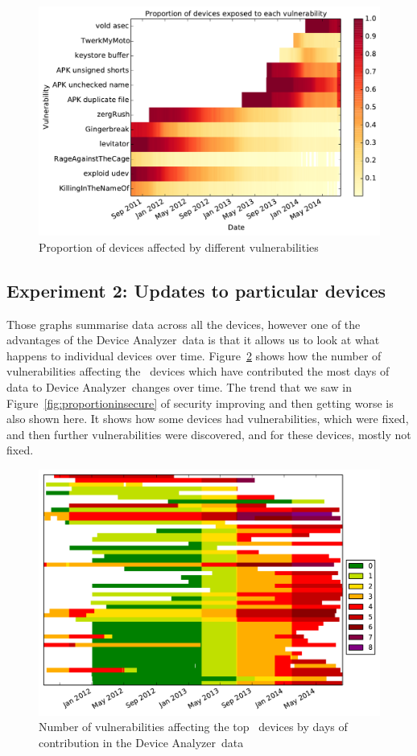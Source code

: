 \documentclass[conference,a4paper,twoside]{IEEEtran}
\newcommand{\da}{Device Analyzer}
\begin{document}
\begin{figure}
 \includegraphics[width=\columnwidth]{figures/nvulnerabilities_heat.pdf}
 \caption{Proportion of devices affected by different vulnerabilities}
 \label{fig:nvulnerabilities_heat}
\end{figure}

\subsection{Experiment 2: Updates to particular devices}\label{sec:exp:device_updates}
Those graphs summarise data across all the devices, however one of the advantages of the \da\ data is that it allows us to look at what happens to individual devices over time.
Figure~\ref{fig:device_data} shows how the number of vulnerabilities affecting the \daNumDeviceDataDevices\ devices which have contributed the most days of data to \da\ changes over time.
The trend that we saw in Figure~\ref{fig:proportioninsecure} of security improving and then getting worse is also shown here.
It shows how some devices had vulnerabilities, which were fixed, and then further vulnerabilities were discovered, and for these devices, mostly not fixed.
\begin{figure}
 \includegraphics[width=\columnwidth]{figures/device-data-all-security}
 \caption{Number of vulnerabilities affecting the top \daNumDeviceDataDevices\ devices by days of contribution in the \da\ data}
 \label{fig:device_data}
\end{figure}
\end{document}
